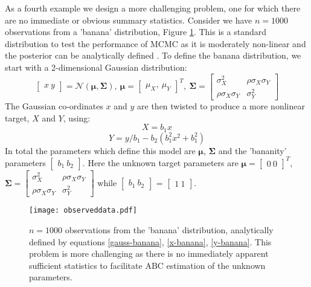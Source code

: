 As a fourth example we design a more challenging problem, one for which there are no immediate or obvious summary statistics. Consider we have $n = 1000$ observations from a 'banana' distribution, Figure \ref{banana-data}. This is a standard distribution to test the performance of MCMC as it is moderately non-linear and the posterior can be analytically defined \citep{Haario1999}. To define the banana distribution, we start with a 2-dimensional Gaussian distribution:
\begin{equation}
\begin{bmatrix}
x\ y
\end{bmatrix}=\mathcal{N}(\bm{\mu},\bm{\Sigma}),\ \bm{\mu} = \begin{bmatrix}
\mu_X,\ \mu_Y
\end{bmatrix}^T,\ \bm{\Sigma} = \begin{bmatrix}
\sigma^2_X & \rho\sigma_X\sigma_Y\\
\rho\sigma_X\sigma_Y & \sigma^2_Y
\end{bmatrix} 
\label{gauss-banana}
\end{equation}
The Gaussian co-ordinates $x$ and $y$ are then twisted to produce a more nonlinear target, $X$ and $Y$, using:
\begin{equation}
X = b_1x
\label{x-banana}
\end{equation}
\begin{equation}
Y = y/b_1-b_2(b_1^2x^2+b_1^2)
\label{y-banana}
\end{equation}
In total the parameters which define this model are $\bm{\mu}$, $\bm{\Sigma}$ and the 'bananity' parameters $\begin{bmatrix}
b_1\ b_2
\end{bmatrix}$. Here the unknown target parameters are $\bm{\mu} = \begin{bmatrix}
0\ 0
\end{bmatrix}^T$,
$\bm{\Sigma} = \begin{bmatrix}
\sigma^2_X & \rho\sigma_X\sigma_Y\\
\rho\sigma_X\sigma_Y & \sigma^2_Y
\end{bmatrix}$ while $\begin{bmatrix}
b_1\ b_2
\end{bmatrix}$ = $\begin{bmatrix}
1\ 1
\end{bmatrix}$. 

\begin{figure}[H]
\centering
\texttt{[image: observeddata.pdf]}
\caption{$n = 1000$ observations from the 'banana' distribution, analytically defined by equations \ref{gauss-banana}, \ref{x-banana}, \ref{y-banana}. 
This problem is more challenging as there is no immediately apparent sufficient statistics to facilitate ABC estimation of the unknown parameters.}
\label{banana-data}
\end{figure}

